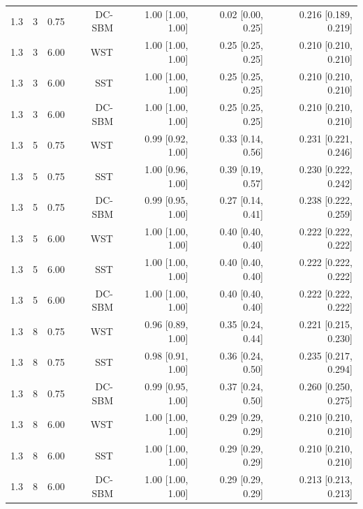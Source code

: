 \begin{table}[!h]
\begin{tabular}[t]{rrrrrrr}
1.3 & 3 & 0.75 & DC-SBM & 1.00 [1.00, 1.00] & 0.02 [0.00, 0.25] & 0.216 [0.189, 0.219]\\
1.3 & 3 & 6.00 & WST & 1.00 [1.00, 1.00] & 0.25 [0.25, 0.25] & 0.210 [0.210, 0.210]\\
1.3 & 3 & 6.00 & SST & 1.00 [1.00, 1.00] & 0.25 [0.25, 0.25] & 0.210 [0.210, 0.210]\\
1.3 & 3 & 6.00 & DC-SBM & 1.00 [1.00, 1.00] & 0.25 [0.25, 0.25] & 0.210 [0.210, 0.210]\\
1.3 & 5 & 0.75 & WST & 0.99 [0.92, 1.00] & 0.33 [0.14, 0.56] & 0.231 [0.221, 0.246]\\
1.3 & 5 & 0.75 & SST & 1.00 [0.96, 1.00] & 0.39 [0.19, 0.57] & 0.230 [0.222, 0.242]\\
1.3 & 5 & 0.75 & DC-SBM & 0.99 [0.95, 1.00] & 0.27 [0.14, 0.41] & 0.238 [0.222, 0.259]\\
1.3 & 5 & 6.00 & WST & 1.00 [1.00, 1.00] & 0.40 [0.40, 0.40] & 0.222 [0.222, 0.222]\\
1.3 & 5 & 6.00 & SST & 1.00 [1.00, 1.00] & 0.40 [0.40, 0.40] & 0.222 [0.222, 0.222]\\
1.3 & 5 & 6.00 & DC-SBM & 1.00 [1.00, 1.00] & 0.40 [0.40, 0.40] & 0.222 [0.222, 0.222]\\
1.3 & 8 & 0.75 & WST & 0.96 [0.89, 1.00] & 0.35 [0.24, 0.44] & 0.221 [0.215, 0.230]\\
1.3 & 8 & 0.75 & SST & 0.98 [0.91, 1.00] & 0.36 [0.24, 0.50] & 0.235 [0.217, 0.294]\\
1.3 & 8 & 0.75 & DC-SBM & 0.99 [0.95, 1.00] & 0.37 [0.24, 0.50] & 0.260 [0.250, 0.275]\\
1.3 & 8 & 6.00 & WST & 1.00 [1.00, 1.00] & 0.29 [0.29, 0.29] & 0.210 [0.210, 0.210]\\
1.3 & 8 & 6.00 & SST & 1.00 [1.00, 1.00] & 0.29 [0.29, 0.29] & 0.210 [0.210, 0.210]\\
1.3 & 8 & 6.00 & DC-SBM & 1.00 [1.00, 1.00] & 0.29 [0.29, 0.29] & 0.213 [0.213, 0.213]\\
\bottomrule
\end{tabular}
\end{table}
